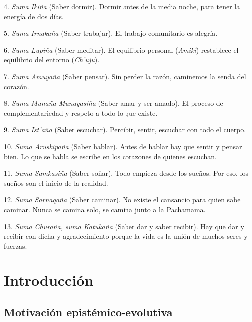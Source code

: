 \documentclass[a4paper,11pt]{book}
\makeatletter
\renewcommand{\mainmatter}{\cleardoublepage\@mainmattertrue}
\theoremstyle{definition}
\makeatother
\begin{document}
4. \emph{Suma Ikiña} (Saber dormir). Dormir antes de la media noche, para tener la energía de dos días.

5. \emph{Suma Irnakaña} (Saber trabajar). El trabajo comunitario es alegría.

6. \emph{Suma Lupiña} (Saber meditar). El equilibrio personal (\emph{Amiki}) restablece el equilibrio del entorno (\emph{Ch'uju}).

7. \emph{Suma Amuyaña} (Saber pensar). Sin perder la razón, caminemos la senda del corazón.

8. \emph{Suma Munaña Munayasiña} (Saber amar y ser amado). El proceso de complementariedad y respeto a todo lo que existe.

9. \emph{Suma Ist'aña} (Saber escuchar). Percibir, sentir, escuchar con todo el cuerpo.

10. \emph{Suma Aruskipaña} (Saber hablar). Antes de hablar hay que sentir y pensar bien. Lo que se habla se escribe en los corazones de quienes escuchan.

11. \emph{Suma Samkasiña} (Saber soñar). Todo empieza desde los sueños. Por eso, los sueños son el inicio de la realidad.

12. \emph{Suma Sarnaqaña} (Saber caminar). No existe el cansancio para quien sabe caminar. Nunca se camina solo, se camina junto a la Pachamama.

13. \emph{Suma Churaña, suma Katukaña} (Saber dar y saber recibir). Hay que dar y recibir con dicha y agradecimiento porque la vida es la unión de muchos seres y fuerzas.







\mainmatter

\chapter{Introducción} \label{ch:evo}


\section{Motivación epistémico-evolutiva}
\end{document}
